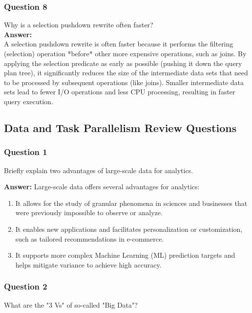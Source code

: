 \documentclass{article}
\begin{document}
\subsubsection*{Question 8}

Why is a selection pushdown rewrite often faster?\\

\textbf{Answer:}\\

A selection pushdown rewrite is often faster because it performs the filtering (selection) operation *before* other more expensive operations, such as joins. By applying the selection predicate as early as possible (pushing it down the query plan tree), it significantly reduces the size of the intermediate data sets that need to be processed by subsequent operations (like joins). Smaller intermediate data sets lead to fewer I/O operations and less CPU processing, resulting in faster query execution.\\


\subsection*{Data and Task Parallelism Review Questions}

\subsubsection*{Question 1}
Briefly explain two advantages of large-scale data for analytics. 

\textbf{Answer:}
Large-scale data offers several advantages for analytics:
\begin{enumerate}
    \item It allows for the study of granular phenomena in sciences and businesses that were previously impossible to observe or analyze.
    \item It enables new applications and facilitates personalization or customization, such as tailored recommendations in e-commerce.
    \item It supports more complex Machine Learning (ML) prediction targets and helps mitigate variance to achieve high accuracy.
\end{enumerate}

\subsubsection*{Question 2}
What are the "3 Vs" of so-called "Big Data"? 
\end{document}
